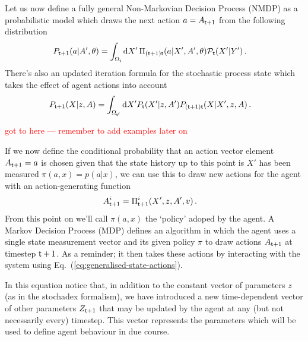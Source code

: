 Let us now define a fully general Non-Markovian Decision Process (NMDP) as a probabilistic model which draws the next action $a=A_{{\sf t}+1}$ from the following distribution
\begin{align}
P_{{\sf t}+1}(a\vert A',\theta) &= \int_{\Omega_{{\sf t}}} {\rm d}X' \, \Pi_{({\sf t}+1){\sf t}}(a\vert X',A',\theta){\cal P}_{{\sf t}}(X'\vert Y') \,.
\end{align}
There's also an updated iteration formula for the stochastic process state which takes the effect of agent actions into account
\begin{align}
P_{{\sf t}+1}(X\vert z,A) &= \int_{\Omega_{{\sf t}'}}{\rm d}X' P_{{\sf t}}(X'\vert z, A') P_{({\sf t}+1){\sf t}}(X\vert X',z,A) \,.
\end{align}


\textcolor{red}{
got to here --- remember to add examples later on
}

If we now define the conditional probability that an action vector element $A_{{\sf t}+1}=a$ is chosen given that the state history up to this point is $X'$ has been measured $\pi (a,x) = p(a\vert x)$, we can use this to draw new actions for the agent with an action-generating function
\begin{align}
A_{{\sf t}+1}^i &= \Pi_{{\sf t}+1}^i(X', z, A', v) \label{eq:action-generating-function} \,.
\end{align}
From this point on we'll call $\pi (a,x)$ the `policy' adoped by the agent. A Markov Decision Process (MDP) defines an algorithm in which the agent uses a single state measurement vector and its given policy $\pi$ to draw actions $A_{{\sf t}+1}$ at timestep ${{\sf t}+1}$. As a reminder; it then takes these actions by interacting with the system using Eq.~(\ref{eq:generalised-state-actions}).

In this equation notice that, in addition to the constant vector of parameters $z$ (as in the stochadex formalism), we have introduced a new time-dependent vector of other parameters $Z_{{\sf t}+1}$ that may be updated by the agent at any (but not necessarily every) timestep. This vector represents the parameters which will be used to define agent behaviour in due course.